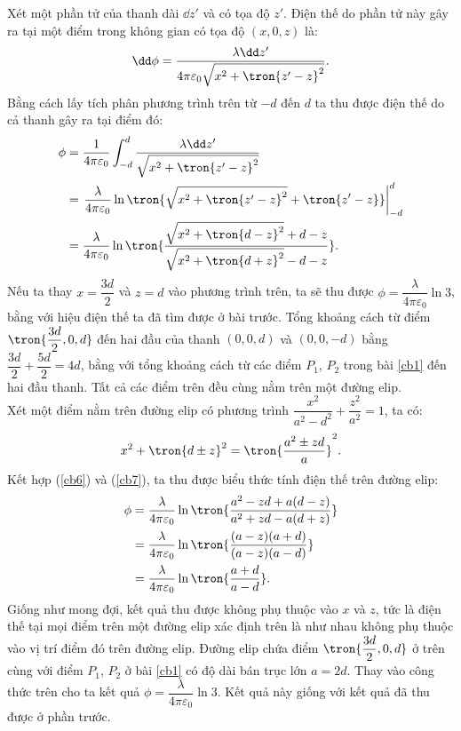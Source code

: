      \begin{loigiai}
        Xét một phần tử của thanh dài $\dd z'$ và có tọa độ $z'$. Điện thế do phần tử này gây ra tại một điểm trong không gian có tọa độ $(x,0,z)$ là:
        \begin{equation}
            \dd \phi=\dfrac{\lambda\dd z'}{4\pi\varepsilon_0 \sqrt{x^2+\tron{z'-z}^2}}.
        \end{equation}
        Bằng cách lấy tích phân phương trình trên từ $-d$ đến $d$ ta thu được điện thế do cả thanh gây ra tại điểm đó:
        \begin{equation}
            \begin{aligned}
               \phi&=\dfrac{1}{4\pi\varepsilon_0}\int_{-d}^d\dfrac{\lambda\dd z'}{\sqrt{x^2+\tron{z'-z}^2}}\\
               &=\left.\dfrac{\lambda}{4\pi\varepsilon_0}\ln\tron{\sqrt{x^2+\tron{z'-z}^2}+\tron{z'-z}}\right|_{-d}^d\\
               &=\dfrac{\lambda}{4\pi\varepsilon_0}\ln\tron{\dfrac{\sqrt{x^2+\tron{d-z}^2}+d-z}{\sqrt{x^2+\tron{d+z}^2}-d-z}}.
               \label{cb6}
            \end{aligned}
        \end{equation} 
        Nếu ta thay $x=\dfrac{3d}{2}$ và $z=d$ vào phương trình trên, ta sẽ thu được $\phi=\dfrac{\lambda}{4\pi\varepsilon_0}\ln 3$, bằng với hiệu điện thế ta đã tìm được ở bài trước. Tổng khoảng cách từ điểm $\tron{\dfrac{3d}{2},0,d}$ đến hai đầu của thanh $(0,0,d)$ và $(0,0,-d)$ bằng $\dfrac{3d}{2}+\dfrac{5d}{2}=4d$, bằng với tổng khoảng cách từ các điểm $P_1$, $P_2$ trong bài \ref{cb1} đến hai đầu thanh. Tất cả các điểm trên đều cùng nằm trên một đường elip.\\
        Xét một điểm nằm trên đường elip có phương trình $\dfrac{x^2}{a^2-d^2}+\dfrac{z^2}{a^2}=1$, ta có:
        \begin{equation}
            x^2+\tron{d\pm z}^2=\tron{\dfrac{a^2\pm zd}{a}}^2.
            \label{cb7}
        \end{equation}
        Kết hợp (\ref{cb6}) và (\ref{cb7}), ta thu được biểu thức tính điện thế trên đường elip:
        \begin{equation}
            \begin{aligned}
               \phi&=\dfrac{\lambda}{4\pi\varepsilon_0}\ln\tron{\dfrac{a^2-zd+a(d-z)}{a^2+zd-a(d+z)}}\\
               &=\dfrac{\lambda}{4\pi\varepsilon_0}\ln\tron{\dfrac{(a-z)(a+d)}{(a-z)(a-d)}}\\
               &=\dfrac{\lambda}{4\pi\varepsilon_0}\ln\tron{\dfrac{a+d}{a-d}}.
            \end{aligned}
        \end{equation}
        Giống như mong đợi, kết quả thu được không phụ thuộc vào $x$ và $z$, tức là điện thế tại mọi điểm trên một đường elip xác định trên là như nhau không phụ thuộc vào vị trí điểm đó trên đường elip. Đường elip chứa điểm $\tron{\dfrac{3d}{2},0,d}$ ở trên cùng với điểm $P_1$, $P_2$ ở bài \ref{cb1} có độ dài bán trục lớn $a=2d$. Thay vào công thức trên cho ta kết quả $\phi=\dfrac{\lambda}{4\pi\varepsilon _0}\ln3$. Kết quả này giống với kết quả đã thu được ở phần trước.
    \end{loigiai}
    
